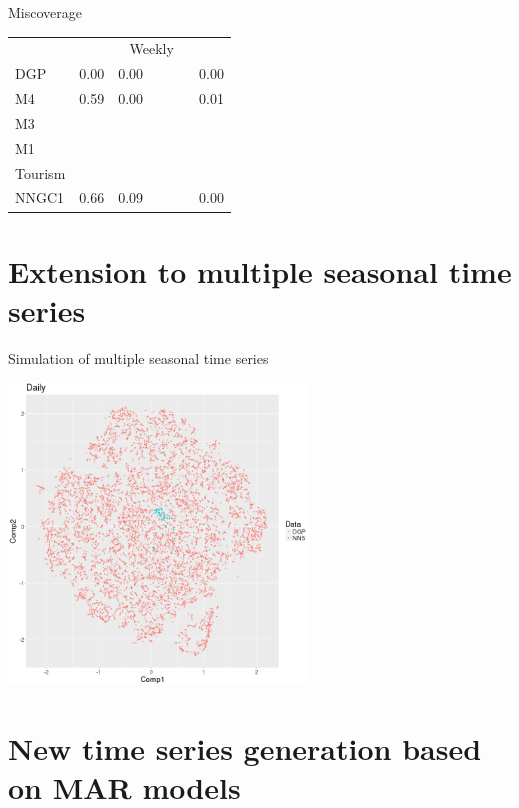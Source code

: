 \documentclass[11pt,ignorenonframetext,compress]{beamer}
\begin{document}
\begin{frame}{Miscoverage}
\begin{table}[!thb]
{\begin{tabular}{p{2cm}p{1.5cm}p{1.5cm}p{1.5cm}p{1.5cm}p{1.5cm}p{1.5cm}}
        \midrule
                  & \multicolumn{6}{c}{Weekly}\\
        DGP & 0.00 & 0.00 &  &  &  & 0.00 \\
        M4 & 0.59 & 0.00 &  &  &  & 0.01 \\
        M3 &  &  &  &  &  &  \\
        M1 &  &  &  &  &  &  \\
        Tourism &  &  &  &  &  &  \\
        NNGC1 & 0.66 & 0.09 &  &  &  & 0.00 \\
        \bottomrule
      \end{tabular}
    }%
    \label{table:miscoverage}
  \end{table}


\end{frame}

\section{Extension to multiple seasonal time
  series}\label{extension-to-multiple-seasonal-time-series}

\begin{frame}{Simulation of multiple seasonal time series}

  \centerline{\includegraphics[width=0.6\textwidth]{figures/daily.png}}

\end{frame}

\section{New time series generation based on MAR
  models}\label{new-time-series-generation-based-on-mar-models}
\end{document}
